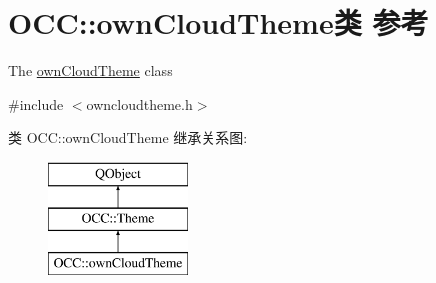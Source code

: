 \hypertarget{class_o_c_c_1_1own_cloud_theme}{}\section{O\+CC\+:\+:own\+Cloud\+Theme类 参考}
\label{class_o_c_c_1_1own_cloud_theme}


The \hyperlink{class_o_c_c_1_1own_cloud_theme}{own\+Cloud\+Theme} class  




{\ttfamily \#include $<$owncloudtheme.\+h$>$}

类 O\+CC\+:\+:own\+Cloud\+Theme 继承关系图\+:\begin{figure}[H]
\begin{center}
\leavevmode
\includegraphics[height=3.000000cm]{class_o_c_c_1_1own_cloud_theme}
\end{center}
\end{figure}
